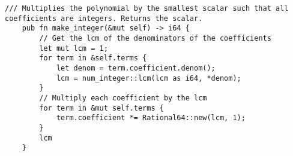 \begin{lstlisting}[caption={The implementation of the \texttt{make\_integer()} method for the \texttt{Polynomial} struct}, label={lst:polynomial-make-integer}]
    /// Multiplies the polynomial by the smallest scalar such that all coefficients are integers. Returns the scalar.
    pub fn make_integer(&mut self) -> i64 {
        // Get the lcm of the denominators of the coefficients
        let mut lcm = 1;
        for term in &self.terms {
            let denom = term.coefficient.denom();
            lcm = num_integer::lcm(lcm as i64, *denom);
        }
        // Multiply each coefficient by the lcm
        for term in &mut self.terms {
            term.coefficient *= Rational64::new(lcm, 1);
        }
        lcm
    }
\end{lstlisting}

